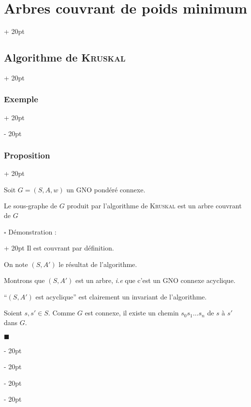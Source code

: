 \documentclass[a4paper, 12pt, twoside]{article}
\newcommand{\ind}[1][20pt]{\advance\leftskip + #1}
\newcommand{\deind}[1][20pt]{\advance\leftskip - #1}
\newenvironment{indt}[2][20pt]{#2 \par \ind[#1]}{\par \deind} %
\newenvironment{proof}[1][{Démonstration :}]{\begin{indt}{$\square$ #1}}{$\blacksquare$ \end{indt}}
\begin{document}
\begin{indt}{\section{Arbres couvrant de poids minimum}}
\begin{indt}{\subsection{Algorithme de \textsc{Kruskal}}}
\begin{indt}{\subsubsection{Exemple}}
\begin{center}
                \end{center}
            \end{indt}

            \begin{indt}{\subsubsection{Proposition}}
                \label{2.3.4}

                Soit $G = (S, A, w)$ un GNO pondéré connexe.

                \begin{pseudocode}
                    Le sous-graphe de $G$ produit par l'algorithme de \textsc{Kruskal} est un arbre couvrant de $G$
                \end{pseudocode}

                \vspace{12pt}
                
                \begin{proof}
                    Il est couvrant par définition.

                    On note $(S, A')$ le résultat de l'algorithme.

                    Montrons que $(S, A')$ est un arbre, \textit{i.e} que c'est un GNO connexe acyclique.

                    ``$(S, A')$ est acyclique'' est clairement un invariant de l'algorithme.

                    Soient $s, s' \in S$. Comme $G$ est connexe, il existe un chemin $s_0 s_1 \ldots s_n$ de $s$ à $s'$ dans $G$.


\end{proof}
\end{indt}
\end{indt}
\end{indt}
\end{document}
